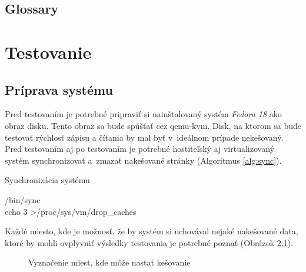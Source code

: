 \section{Glossary}

%
%

\chapter{Testovanie}

\section{Príprava systému}

Pred testovaním je potrebné pripraviť si nainštalovaný systém \emph{Fedora 18}
ako obraz disku. Tento obraz sa bude spúšťať cez qemu-kvm. Disk, na ktorom sa
bude testovať rýchlosť zápisu a čítania by mal byť v~ideálnom prípade
nekešovaný.  Pred testovaním aj po testovaním je potrebné hostiteľský aj
virtualizovaný systém synchronizovať a~zmazať nakešované stránky (Algoritmus
\ref{alg:sync}).

\begin{algorithm}
    \label{alg:sync}
    \caption{Synchronizácia systému}
    /bin/sync\\
    echo 3 \textgreater /proc/sys/vm/drop\_caches
\end{algorithm}

Každé miesto, kde je možnosť, že by systém si uchovával nejaké nakešované data,
ktoré by mohli ovplyvniť výsledky testovania je potrebné poznať (Obrázok \ref{graf-cache}).

\begin{figure}[ht]
\begin{center}
  \caption{Vyznačenie miest, kde môže nastať kešovanie}
  \label{graf-cache}
\end{center}
\end{figure}

